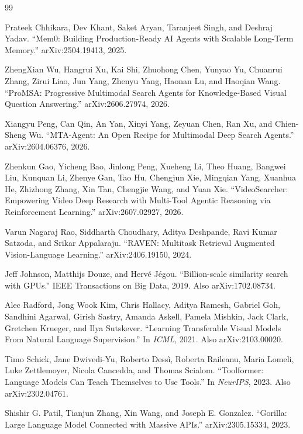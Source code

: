\documentclass[11pt,a4paper]{article}
\begin{document}
\begin{thebibliography}{99}

Prateek Chhikara, Dev Khant, Saket Aryan, Taranjeet Singh, and Deshraj Yadav.
``Mem0: Building Production-Ready AI Agents with Scalable Long-Term Memory.''
arXiv:2504.19413, 2025.

ZhengXian Wu, Hangrui Xu, Kai Shi, Zhuohong Chen, Yunyao Yu, Chuanrui Zhang, Zirui Liao, Jun Yang, Zhenyu Yang, Haonan Lu, and Haoqian Wang.
``ProMSA: Progressive Multimodal Search Agents for Knowledge-Based Visual Question Answering.''
arXiv:2606.27974, 2026.

Xiangyu Peng, Can Qin, An Yan, Xinyi Yang, Zeyuan Chen, Ran Xu, and Chien-Sheng Wu.
``MTA-Agent: An Open Recipe for Multimodal Deep Search Agents.''
arXiv:2604.06376, 2026.

Zhenkun Gao, Yicheng Bao, Jinlong Peng, Xueheng Li, Theo Huang, Bangwei Liu, Kunquan Li, Zhenye Gan, Tao Hu, Chengjun Xie, Mingqian Yang, Xuanhua He, Zhizhong Zhang, Xin Tan, Chengjie Wang, and Yuan Xie.
``VideoSearcher: Empowering Video Deep Research with Multi-Tool Agentic Reasoning via Reinforcement Learning.''
arXiv:2607.02927, 2026.

Varun Nagaraj Rao, Siddharth Choudhary, Aditya Deshpande, Ravi Kumar Satzoda, and Srikar Appalaraju.
``RAVEN: Multitask Retrieval Augmented Vision-Language Learning.''
arXiv:2406.19150, 2024.

Jeff Johnson, Matthijs Douze, and Herv\'e J\'egou.
``Billion-scale similarity search with GPUs.''
IEEE Transactions on Big Data, 2019.
Also arXiv:1702.08734.

Alec Radford, Jong Wook Kim, Chris Hallacy, Aditya Ramesh, Gabriel Goh, Sandhini Agarwal, Girish Sastry, Amanda Askell, Pamela Mishkin, Jack Clark, Gretchen Krueger, and Ilya Sutskever.
``Learning Transferable Visual Models From Natural Language Supervision.''
In \emph{ICML}, 2021.
Also arXiv:2103.00020.

Timo Schick, Jane Dwivedi-Yu, Roberto Dess\`i, Roberta Raileanu, Maria Lomeli, Luke Zettlemoyer, Nicola Cancedda, and Thomas Scialom.
``Toolformer: Language Models Can Teach Themselves to Use Tools.''
In \emph{NeurIPS}, 2023.
Also arXiv:2302.04761.

Shishir G. Patil, Tianjun Zhang, Xin Wang, and Joseph E. Gonzalez.
``Gorilla: Large Language Model Connected with Massive APIs.''
arXiv:2305.15334, 2023.


\end{thebibliography}
\end{document}
